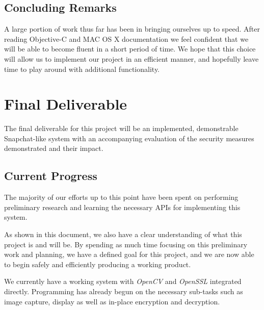 \documentclass[11pt, a4paper,titlepage]{report}
\begin{document}
\section{Concluding Remarks}
A large portion of work thus far has been in bringing ourselves up to speed. After reading Objective-C and MAC OS X documentation we feel confident that we will be able to become fluent in a short period of time. We hope that this choice will allow us to implement our project in an efficient manner, and hopefully leave time to play around with additional functionality.

\chapter{Final Deliverable}
The final deliverable for this project will be an implemented, demonstrable Snapchat-like system with an accompanying evaluation of the security measures demonstrated and their impact.
\section{Current Progress}
The majority of our efforts up to this point have been spent on performing preliminary research and learning the necessary APIs for implementing this system.

As shown in this document, we also have a clear understanding of what this project is and will be. By spending as much time focusing on this preliminary work and planning, we have a defined goal for this project, and we are now able to begin safely and efficiently producing a working product.

We currently have a working system with \emph{OpenCV} and \emph{OpenSSL} integrated directly. Programming has already begun on the necessary sub-tasks such as image capture, display as well as in-place encryption and decryption.


\printbibliography 
\nocite{*}
\end{document}
